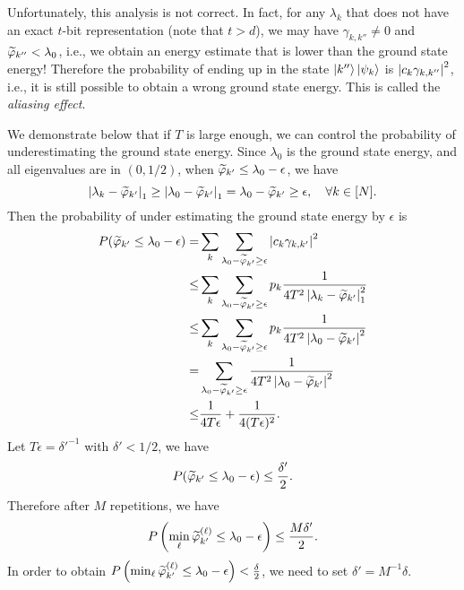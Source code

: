 Unfortunately, this analysis is not correct.
In fact, for any $\lambda_k$ that does not have an exact $t$-bit representation (note that $t>d$), we may have $\gamma_{k,k''}\ne 0$ and $\widetilde{\varphi}_{k''}<\lambda_0$, i.e., we obtain an energy estimate that is lower than the ground state energy! Therefore the probability of ending up in the state $\ket{k''}\ket{\psi_k}$ is $\left\lvert c_k\gamma_{k,k''}\right\rvert^2$, i.e., it is still possible to obtain a wrong ground state energy. This is called the \emph{aliasing effect}.

We demonstrate below that if $T$ is large enough, we can control the probability of underestimating the ground state energy. 
Since $\lambda_0$ is the ground state energy, and all eigenvalues are in $(0,1/2)$, when $\widetilde{\varphi}_{k'}\le \lambda_0-\epsilon$, we have 
\begin{equation}
\left\lvert\lambda_k-\widetilde{\varphi}_{k'}\right\rvert_1\ge \left\lvert\lambda_0-\widetilde{\varphi}_{k'}\right\rvert_1=\lambda_0-\widetilde{\varphi}_{k'}\ge \epsilon, \quad \forall k\in[N].
\end{equation}
Then the probability of under estimating the ground state energy by $\epsilon$ is
\begin{equation}
\begin{split}
P(\widetilde{\varphi}_{k'}\le \lambda_0-\epsilon)=&\sum_k \sum_{\lambda_0-\widetilde{\varphi}_{k'}\ge \epsilon} \left\lvert c_k \gamma_{k,k'}\right\rvert^2\\
\le & \sum_{k} \sum_{\lambda_0-\widetilde{\varphi}_{k'}\ge \epsilon} p_k \frac{1}{4T^2 \left\lvert\lambda_k-\widetilde{\varphi}_{k'}\right\rvert_1^2}\\
\le & \sum_{k} \sum_{\lambda_0-\widetilde{\varphi}_{k'}\ge \epsilon} p_k \frac{1}{4T^2 \left\lvert\lambda_0-\widetilde{\varphi}_{k'}\right\rvert^2}\\
=   & \sum_{\lambda_0-\widetilde{\varphi}_{k'}\ge \epsilon}\frac{1}{4T^2 \left\lvert\lambda_0-\widetilde{\varphi}_{k'}\right\rvert^2}\\
\le & \frac{1}{4T\epsilon}+\frac{1}{4(T\epsilon)^2}.
\end{split}
\end{equation}
Let $T\epsilon=\delta'^{-1}$ with $\delta'<1/2$, we have
\begin{equation}
P(\widetilde{\varphi}_{k'}\le \lambda_0-\epsilon)\le \frac{\delta'}{2}.
\end{equation}
Therefore after $M$ repetitions, we have
\begin{equation}
P\left(\min_{\ell}\widetilde{\varphi}^{(\ell)}_{k'}\le \lambda_0-\epsilon\right)\le \frac{M\delta'}{2}.
\end{equation}
In order to obtain $P\left(\min_{\ell}\widetilde{\varphi}^{(\ell)}_{k'}\le \lambda_0-\epsilon\right)<\frac{\delta}{2}$, we need to set $\delta'=M^{-1} \delta$.

